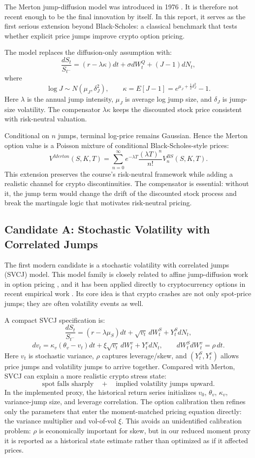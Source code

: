 \documentclass[11pt]{article}
\begin{document}
The Merton jump-diffusion model was introduced in 1976 \cite{merton1976}. It is therefore not recent enough to be the final innovation by itself. In this report, it serves as the first serious extension beyond Black-Scholes: a classical benchmark that tests whether explicit price jumps improve crypto option pricing.

The model replaces the diffusion-only assumption with:
\[
\frac{dS_t}{S_{t^-}}=(r-\lambda\kappa)dt+\sigma dW_t^Q+(J-1)dN_t,
\]
where
\[
\log J\sim N(\mu_J,\delta_J^2),\qquad
\kappa=E[J-1]=e^{\mu_J+\frac{1}{2}\delta_J^2}-1.
\]
Here $\lambda$ is the annual jump intensity, $\mu_J$ is average log jump size, and $\delta_J$ is jump-size volatility. The compensator $\lambda\kappa$ keeps the discounted stock price consistent with risk-neutral valuation.

Conditional on $n$ jumps, terminal log-price remains Gaussian. Hence the Merton option value is a Poisson mixture of conditional Black-Scholes-style prices:
\[
V^{Merton}(S,K,T)=
\sum_{n=0}^{\infty}
e^{-\lambda T}\frac{(\lambda T)^n}{n!}V^{BS}_n(S,K,T).
\]
This extension preserves the course's risk-neutral framework while adding a realistic channel for crypto discontinuities. The compensator is essential: without it, the jump term would change the drift of the discounted stock process and break the martingale logic that motivates risk-neutral pricing.

\subsection{Candidate A: Stochastic Volatility with Correlated Jumps}

The first modern candidate is a stochastic volatility with correlated jumps (SVCJ) model. This model family is closely related to affine jump-diffusion work in option pricing \cite{bates1996,duffie2000}, and it has been applied directly to cryptocurrency options in recent empirical work \cite{hou2020crypto}. Its core idea is that crypto crashes are not only spot-price jumps; they are often volatility events as well.

A compact SVCJ specification is:
\[
\frac{dS_t}{S_{t^-}}
=(r-\lambda \mu_S)dt+\sqrt{v_t}\,dW_t^S+Y_t^S dN_t,
\]
\[
dv_t=\kappa_v(\theta_v-v_t)dt+\xi\sqrt{v_t}\,dW_t^v+Y_t^v dN_t,
\qquad
dW_t^S dW_t^v=\rho\,dt.
\]
Here $v_t$ is stochastic variance, $\rho$ captures leverage/skew, and $(Y_t^S,Y_t^v)$ allows price jumps and volatility jumps to arrive together. Compared with Merton, SVCJ can explain a more realistic crypto stress state:
\[
\text{spot falls sharply}\quad+\quad\text{implied volatility jumps upward}.
\]
In the implemented proxy, the historical return series initializes $v_0$, $\theta_v$, $\kappa_v$, variance-jump size, and leverage correlation. The option calibration then refines only the parameters that enter the moment-matched pricing equation directly: the variance multiplier and vol-of-vol $\xi$. This avoids an unidentified calibration problem: $\rho$ is economically important for skew, but in our reduced moment proxy it is reported as a historical state estimate rather than optimized as if it affected prices.
\end{document}
